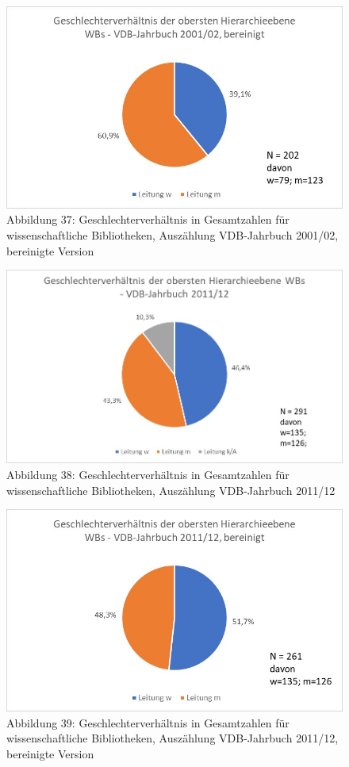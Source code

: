 \documentclass[a4paper,
fontsize=11pt,
oneside,
numbers=noperiodatend,
parskip=half-,
bibliography=totoc,
final
]{scrartcl}
\begin{document}
\begin{figure}
\centering
\includegraphics{img/Abb.37_VDB-2001_gesamt_bereinigt.jpg}
\caption{Abbildung 37: Geschlechterverhältnis in Gesamtzahlen für
wissenschaftliche Bibliotheken, Auszählung VDB-Jahrbuch 2001/02,
bereinigte Version}
\end{figure}

\begin{figure}
\centering
\includegraphics{img/Abb.38_VDB-2011_gesamt.jpg}
\caption{Abbildung 38: Geschlechterverhältnis in Gesamtzahlen für
wissenschaftliche Bibliotheken, Auszählung VDB-Jahrbuch 2011/12}
\end{figure}

\begin{figure}
\centering
\includegraphics{img/Abb.39_VDB-2011_gesamt_bereinigt.jpg}
\caption{Abbildung 39: Geschlechterverhältnis in Gesamtzahlen für
wissenschaftliche Bibliotheken, Auszählung VDB-Jahrbuch 2011/12,
bereinigte Version}
\end{figure}
\end{document}
